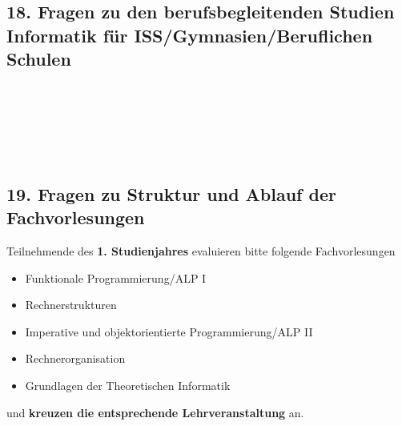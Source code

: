 \documentclass[a4paper,10pt]{article}
\makeatletter
\def\saveenum{\xdef\@savedenum{\the\c@enumi\relax}}
\makeatother
\begin{document}
{\pagebreak




\subsection*{18. Fragen zu den berufsbegleitenden Studien Informatik für ISS/Gymnasien/Beruflichen Schulen}


 \\

\begin{enumerate}

 \\
 \\
 \\

\end{enumerate} \saveenum

\vspace{-1cm}



\pagebreak


\subsection*{19. Fragen zu Struktur und Ablauf der Fachvorlesungen}

Teilnehmende des \textbf{1. Studienjahres} evaluieren bitte folgende Fachvorlesungen
\begin{itemize}
	\item Funktionale Programmierung/ALP I
	\item Rechnerstrukturen
	\item Imperative und objektorientierte Programmierung/ALP II
	\item Rechnerorganisation
	\item Grundlagen der Theoretischen Informatik
\end{itemize}
und \textbf{kreuzen die entsprechende Lehrveranstaltung} an. \\

}
\end{document}

